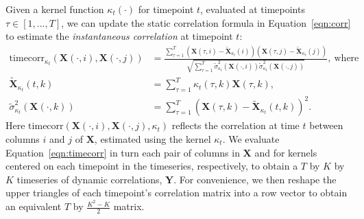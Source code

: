 \documentclass[english]{article}
\begin{document}
Given a kernel function $\kappa_t(\cdot)$ for timepoint $t$,
evaluated at timepoints $\tau \in \left[ 1, ..., T \right]$, we
can update the static correlation formula in Equation~\ref{eqn:corr}
to estimate the \textit{instantaneous correlation} at timepoint $t$:
\begin{align}
  \mathrm{timecorr}_{\kappa_t}\left(\mathbf{X}(\cdot, i), \mathbf{X}(\cdot, j)\right) &= \frac{\sum_{\tau=1}^T \left( \mathbf{X}(\tau, i) -
                                       \widetilde{\mathbf{X}}_{\kappa_t}(i) \right)
                                 \left( \mathbf{X}(\tau, j) -
                                        \widetilde{\mathbf{X}}_{\kappa_t}(j)\right)}
              {\sqrt{\sum_{\tau=1}^T
                                              \widetilde{\sigma}_{\kappa_t}^2(\mathbf{X}(\cdot,
                                                                                        i))
                                              \widetilde{\sigma}_{\kappa_t}^2(\mathbf{X}(\cdot, j))}},~\mathrm{where}\\\label{eqn:timecorr}
  \widetilde{\mathbf{X}}_{\kappa_t}(t, k) &= \sum_{\tau=1}^T
                       \kappa_t(\tau, k)\mathbf{X}(\tau, k),\\
  \widetilde{\sigma}_{\kappa_t}^2(\mathbf{X}(\cdot, k)) &= \sum_{\tau=1}^T
                                                  \left(
                                                  \mathbf{X}(\tau, k) -
                            \widetilde{\mathbf{X}}_{\kappa_t}(t, k) \right)^2.
\end{align}
Here
$\mathrm{timecorr}(\mathbf{X}(\cdot, i), \mathbf{X}(\cdot, j),
\kappa_t)$ reflects the correlation at time $t$ between columns $i$
and $j$ of $\mathbf{X}$, estimated using the kernel $\kappa_t$.  We
evaluate Equation~\ref{eqn:timecorr} in turn each pair of columns in
$\mathbf{X}$ and for kernels centered on each timepoint in the
timeseries, respectively, to obtain a $T$ by $K$ by $K$ timeseries of
dynamic correlations, $\mathbf{Y}$.  For convenience, we then reshape
the upper triangles of each timepoint's correlation matrix into a row
vector to obtain an equivalent $T$ by $\frac{K^2 - K}{2}$ matrix.
\end{document}
